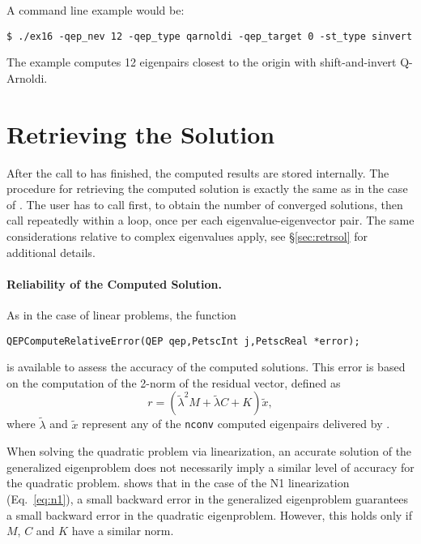 A command line example would be:
	\begin{Verbatim}[fontsize=\small]
	$ ./ex16 -qep_nev 12 -qep_type qarnoldi -qep_target 0 -st_type sinvert
	\end{Verbatim}
The example computes 12 eigenpairs closest to the origin with shift-and-invert Q-Arnoldi.

\section{Retrieving the Solution}

After the call to  has finished, the computed results are stored internally. The procedure for retrieving the computed solution is exactly the same as in the case of . The user has to call  first, to obtain the number of converged solutions, then call  repeatedly within a loop, once per each eigenvalue-eigenvector pair. The same considerations relative to complex eigenvalues apply, see \S\ref{sec:retrsol} for additional details.

\paragraph{Reliability of the Computed Solution.}

As in the case of linear problems, the function
	\begin{Verbatim}[fontsize=\small]
	QEPComputeRelativeError(QEP qep,PetscInt j,PetscReal *error);
	\end{Verbatim}
is available to assess the accuracy of the computed solutions. This error is based on the computation of the 2-norm of the residual vector, defined as
\begin{equation}
r=(\tilde{\lambda}^2M+\tilde{\lambda} C+K)\tilde{x},\label{eq:resquad}
\end{equation}
where $\tilde{\lambda}$ and $\tilde{x}$ represent any of the \texttt{nconv} computed eigenpairs delivered by .

When solving the quadratic problem via linearization, an accurate solution of the generalized eigenproblem does not necessarily imply a similar level of accuracy for the quadratic problem. \cite{Tisseur:2000:BEC} shows that in the case of the N1 linearization (Eq.\ \ref{eq:n1}), a small backward error in the generalized eigenproblem guarantees a small backward error in the quadratic eigenproblem. However, this holds only if $M$, $C$ and $K$ have a similar norm.


